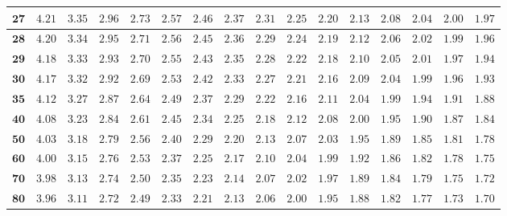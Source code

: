 \begin{customTableWrapper}{1.4}
\begin{longtable}{|r|r|r|r|r|r|r|r|r|r|r|r|r|r|r|r|}
    ${\mathbf{27}}$  & ${4.21}$   & ${3.35}$   & ${2.96}$   & ${2.73}$   & ${2.57}$   & ${2.46}$   & ${2.37}$   & ${2.31}$   & ${2.25}$   & ${2.20}$   & ${2.13}$   & ${2.08}$   & ${2.04}$   & ${2.00}$   & ${1.97}$   \\ \hline
    ${\mathbf{28}}$  & ${4.20}$   & ${3.34}$   & ${2.95}$   & ${2.71}$   & ${2.56}$   & ${2.45}$   & ${2.36}$   & ${2.29}$   & ${2.24}$   & ${2.19}$   & ${2.12}$   & ${2.06}$   & ${2.02}$   & ${1.99}$   & ${1.96}$   \\ \hline
    ${\mathbf{29}}$  & ${4.18}$   & ${3.33}$   & ${2.93}$   & ${2.70}$   & ${2.55}$   & ${2.43}$   & ${2.35}$   & ${2.28}$   & ${2.22}$   & ${2.18}$   & ${2.10}$   & ${2.05}$   & ${2.01}$   & ${1.97}$   & ${1.94}$   \\ \hline
    ${\mathbf{30}}$  & ${4.17}$   & ${3.32}$   & ${2.92}$   & ${2.69}$   & ${2.53}$   & ${2.42}$   & ${2.33}$   & ${2.27}$   & ${2.21}$   & ${2.16}$   & ${2.09}$   & ${2.04}$   & ${1.99}$   & ${1.96}$   & ${1.93}$   \\ \hline
    ${\mathbf{35}}$  & ${4.12}$   & ${3.27}$   & ${2.87}$   & ${2.64}$   & ${2.49}$   & ${2.37}$   & ${2.29}$   & ${2.22}$   & ${2.16}$   & ${2.11}$   & ${2.04}$   & ${1.99}$   & ${1.94}$   & ${1.91}$   & ${1.88}$   \\ \hline
    ${\mathbf{40}}$  & ${4.08}$   & ${3.23}$   & ${2.84}$   & ${2.61}$   & ${2.45}$   & ${2.34}$   & ${2.25}$   & ${2.18}$   & ${2.12}$   & ${2.08}$   & ${2.00}$   & ${1.95}$   & ${1.90}$   & ${1.87}$   & ${1.84}$   \\ \hline
    ${\mathbf{50}}$  & ${4.03}$   & ${3.18}$   & ${2.79}$   & ${2.56}$   & ${2.40}$   & ${2.29}$   & ${2.20}$   & ${2.13}$   & ${2.07}$   & ${2.03}$   & ${1.95}$   & ${1.89}$   & ${1.85}$   & ${1.81}$   & ${1.78}$   \\ \hline
    ${\mathbf{60}}$  & ${4.00}$   & ${3.15}$   & ${2.76}$   & ${2.53}$   & ${2.37}$   & ${2.25}$   & ${2.17}$   & ${2.10}$   & ${2.04}$   & ${1.99}$   & ${1.92}$   & ${1.86}$   & ${1.82}$   & ${1.78}$   & ${1.75}$   \\ \hline
    ${\mathbf{70}}$  & ${3.98}$   & ${3.13}$   & ${2.74}$   & ${2.50}$   & ${2.35}$   & ${2.23}$   & ${2.14}$   & ${2.07}$   & ${2.02}$   & ${1.97}$   & ${1.89}$   & ${1.84}$   & ${1.79}$   & ${1.75}$   & ${1.72}$   \\ \hline
    ${\mathbf{80}}$  & ${3.96}$   & ${3.11}$   & ${2.72}$   & ${2.49}$   & ${2.33}$   & ${2.21}$   & ${2.13}$   & ${2.06}$   & ${2.00}$   & ${1.95}$   & ${1.88}$   & ${1.82}$   & ${1.77}$   & ${1.73}$   & ${1.70}$   \\ \hline

\end{longtable}
\end{customTableWrapper}
